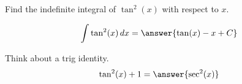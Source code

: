 \documentclass{ximera}
\author{Gregory Hartman \and Matthew Carr \and Bobby Ramsey}
\begin{document}
\begin{exercise}

Find the indefinite integral of $\tan^{2}(x)$ with respect to $x$.

\[
\int \tan^2(x)\d x=\answer{\tan(x)-x+C}
\]
\begin{hint}
	Think about a trig identity. 
	\[ \tan^2(x) + 1 = \answer{\sec^2(x)} \]
\end{hint}

\end{exercise}
\end{document}

